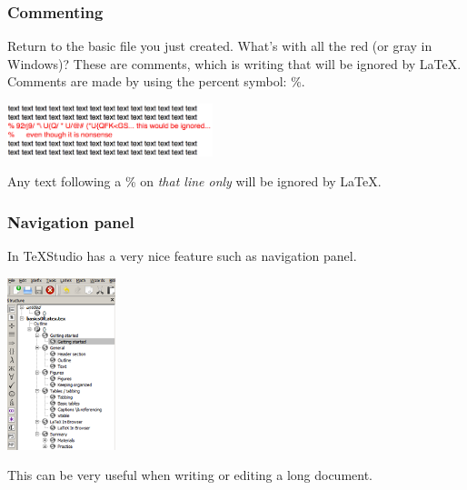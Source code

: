 \documentclass[slidestop,compress,mathserif]{beamer}
\begin{document}
\begin{frame} \frametitle{Commenting}
Return to the basic file you just created. What's with all the red (or gray in Windows)? These are comments, which is writing that will be ignored by LaTeX. Comments are made by using the percent symbol: {\color{comment}\%}.
\begin{center}
\includegraphics[height=0.6in]{basicsOfLatex/gettingStarted/commenting}
\end{center}
Any text following a {\color{comment}\%} on \emph{that line only} will be ignored by LaTeX.
\end{frame}


\begin{frame} \frametitle{Navigation panel}
	
In TeXStudio has a very nice feature such as navigation panel.

\begin{center} 					\includegraphics[height=5cm]{basicsOfLatex/gettingStarted/texstudioNavigationPanel}
\end{center}

This can be very useful when writing or editing a long document.
\end{frame}
\end{document}
